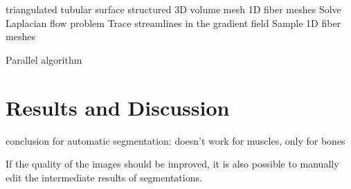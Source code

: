 
\begin{algorithm}
  \begin{algorithmic}[1]%
    \Require triangulated tubular surface
    \Ensure structured 3D volume mesh
    \Ensure 1D fiber meshes
    \Statex
    \State Solve Laplacian flow problem
    \State Trace streamlines in the gradient field
    \State Sample 1D fiber meshes
    \EndProcedure
  \end{algorithmic}%
  \caption{Parallel algorithm}%
  \label{alg:parallel_algorithm_1}%
\end{algorithm}%


\section{Results and Discussion}

conclusion for automatic segmentation: doesn't work for muscles, only for bones

If the quality of the images should be improved, it is also possible to manually edit the intermediate results of segmentations.
